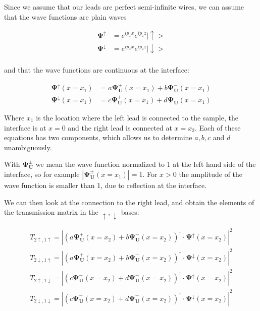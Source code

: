 Since we assume that our leads are perfect semi-infinite wires, we can assume
that the wave functions are plain waves

\begin{align*}
    \mathbf{\Psi^\uparrow}   &=  e^{i p_x x} e^{i p_z z} |\uparrow> \\
    \mathbf{\Psi^\downarrow} &=  e^{i p_x x} e^{i p_z z} |\downarrow> \\
\end{align*}

and that the wave functions are continuous at the interface:

\begin{align*}
    \mathbf{\Psi^\uparrow}(x=x_1) &=
        a \mathbf{\Psi^+_U}(x=x_1) + b  \mathbf{\Psi^-_U}(x=x_1)\\
    \mathbf{\Psi^\downarrow}(x=x_1) &=
        c \mathbf{\Psi^+_U}(x=x_1) + d  \mathbf{\Psi^-_U}(x=x_1)
\end{align*}

Where $x_1$ is the location where the left lead is connected to the sample, the
interface is at $x = 0$ and the right lead is connected at $x = x_2$.
Each of these equations has two components, which allows us to determine
$a, b, c$ and $d$ unambiguously.

With $\mathbf{\Psi^\pm_U}$ we mean the wave function normalized to 1 at the
left hand side of the interface, so for example
$|\mathbf{\Psi^\pm_U}(x=x_1)|=1$. For $x>0$ the amplitude of the wave function
is smaller than 1, due to reflection at the interface.

We can then look at the connection to the right lead, and obtain the 
elements of the transmission matrix in the $\uparrow, \downarrow$ bases:

\begin{align}
    T_{2\uparrow,1\uparrow} = \left| \left( 
        a \mathbf{\Psi^+_U}(x=x_2) + b  \mathbf{\Psi^-_U}(x=x_2)
    \right)^\dagger \cdot \mathbf{\Psi}^\uparrow(x=x_2) \right|^2\\
    T_{2\downarrow,1\uparrow} = \left| \left( 
        a \mathbf{\Psi^+_U}(x=x_2) + b  \mathbf{\Psi^-_U}(x=x_2)
    \right)^\dagger \cdot \mathbf{\Psi}^\downarrow(x=x_2) \right|^2\\
    T_{2\uparrow,1\downarrow} = \left| \left( 
        c \mathbf{\Psi^+_U}(x=x_2) + d  \mathbf{\Psi^-_U}(x=x_2)
    \right)^\dagger \cdot \mathbf{\Psi}^\uparrow(x=x_2) \right|^2\\
    T_{2\downarrow,1\downarrow} = \left| \left( 
        c \mathbf{\Psi^+_U}(x=x_2) + d  \mathbf{\Psi^-_U}(x=x_2)
    \right)^\dagger \cdot \mathbf{\Psi}^\downarrow(x=x_2) \right|^2
\end{align}





